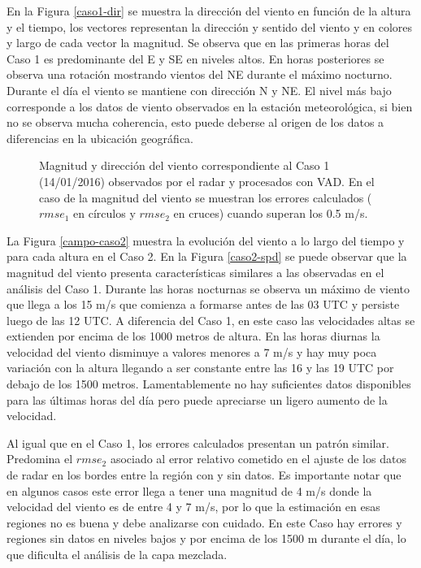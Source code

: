 \documentclass[12pt,spanish,oneside]{book}
\begin{document}
En la Figura \ref{caso1-dir} se muestra la dirección del viento en
función de la altura y el tiempo, los vectores representan la dirección
y sentido del viento y en colores y largo de cada vector la magnitud. Se
observa que en las primeras horas del Caso 1 es predominante del E y SE
en niveles altos. En horas posteriores se observa una rotación mostrando
vientos del NE durante el máximo nocturno. Durante el día el viento se
mantiene con dirección N y NE. El nivel más bajo corresponde a los datos
de viento observados en la estación meteorológica, si bien no se observa
mucha coherencia, esto puede deberse al origen de los datos a
diferencias en la ubicación geográfica.

\begin{figure}
\newline{}\caption{Magnitud y dirección del viento  correspondiente al Caso 1 (14/01/2016) observados por el radar y procesados con VAD. En el caso de la magnitud del viento se muestran los errores calculados ($rmse_1$ en círculos y $rmse_2$ en cruces) cuando superan los 0.5 m/s. \label{campo-caso1}}\label{fig:campo-caso1}
\end{figure}

La Figura \ref{campo-caso2} muestra la evolución del viento a lo largo
del tiempo y para cada altura en el Caso 2. En la Figura \ref{caso2-spd}
se puede observar que la magnitud del viento presenta características
similares a las observadas en el análisis del Caso 1. Durante las horas
nocturnas se observa un máximo de viento que llega a los 15 m/s que
comienza a formarse antes de las 03 UTC y persiste luego de las 12 UTC.
A diferencia del Caso 1, en este caso las velocidades altas se extienden
por encima de los 1000 metros de altura. En las horas diurnas la
velocidad del viento disminuye a valores menores a 7 m/s y hay muy poca
variación con la altura llegando a ser constante entre las 16 y las 19
UTC por debajo de los 1500 metros. Lamentablemente no hay suficientes
datos disponibles para las últimas horas del día pero puede apreciarse
un ligero aumento de la velocidad.

Al igual que en el Caso 1, los errores calculados presentan un patrón
similar. Predomina el \(rmse_2\) asociado al error relativo cometido en
el ajuste de los datos de radar en los bordes entre la región con y sin
datos. Es importante notar que en algunos casos este error llega a tener
una magnitud de 4 m/s donde la velocidad del viento es de entre 4 y 7
m/s, por lo que la estimación en esas regiones no es buena y debe
analizarse con cuidado. En este Caso hay errores y regiones sin datos en
niveles bajos y por encima de los 1500 m durante el día, lo que
dificulta el análisis de la capa mezclada.
\end{document}
